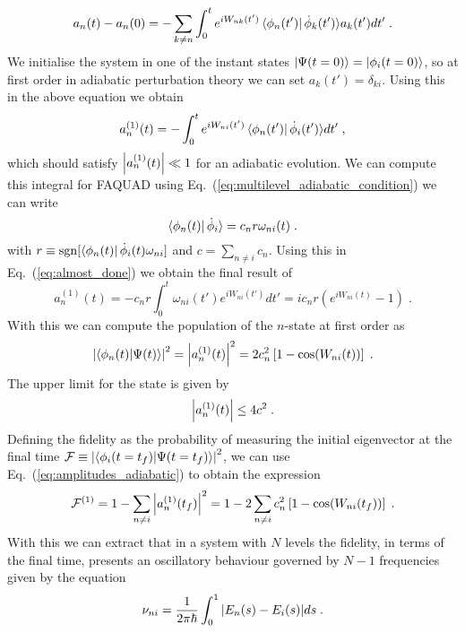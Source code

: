 \begin{equation}
	a_n(t)-a_n(0)=-\sum_{k\neq n}\int_0^te^{iW_{nk}(t')}\bra{\phi_n(t')}\dot{\phi}_k(t')\rangle a_k(t') dt'\; .
\end{equation}
We initialise the system in one of the instant states $\ket{\Psi(t=0)}=\ket{\phi_i(t=0)}$, so at first order in adiabatic perturbation theory we can set $a_k(t')=\delta_{ki}$. Using this in the above equation we obtain
\begin{equation}
	a_n^{(1)}(t)=-\int_0^te^{iW_{ni}(t')}\bra{\phi_n(t')}\dot{\phi}_i(t')\rangle dt'\; ,
	\label{eq:almost_done}
\end{equation}
which should satisfy $\abs{a_n^{(1)}(t)}\ll 1$ for an adiabatic evolution. We can compute this integral for FAQUAD using Eq.~(\ref{eq:multilevel_adiabatic_condition}) we can write
\begin{equation}
	\bra{\phi_n(t)}\dot{\phi}_i\rangle=c_nr\omega_{ni}(t)\; .
\end{equation}
with $r\equiv\operatorname{sgn}[\bra{\phi_n(t)}\dot{\phi}_i(t)\omega_{ni}]$ and $c=\sum_{n\neq i}c_n$. Using this in Eq.~(\ref{eq:almost_done}) we obtain the final result of
\begin{equation}
	a_n^{(1)}(t)=-c_nr\int_0^t\omega_{ni}(t')e^{iW_{ni}(t')}dt'=ic_nr\left(e^{iW_{ni}(t)}-1\right)\; .
\end{equation}
With this we can compute the population of the $n$-state at first order as
\begin{equation}
	\abs{\braket{\phi_n(t)}{\Psi(t)}}^2=\abs{a^{(1)}_n(t)}^2=2c_n^2\left[1-\cos(W_{ni}(t))\right]\; .
	\label{eq:amplitudes_adiabatic}
\end{equation}
The upper limit for the state is given by
\begin{equation}
	\abs{a_n^{(1)}(t)}\leq 4c^2\; .
\end{equation}
Defining the fidelity as the probability of measuring the initial eigenvector at the final time $\mathcal{F}\equiv \abs{\braket{\phi_i(t=t_f)}{\Psi(t=t_f)}}^2$, we can use Eq.~(\ref{eq:amplitudes_adiabatic}) to obtain the expression
\begin{equation}
	\mathcal{F}^{(1)}=1-\sum_{n\neq i}\abs{a_n^{(1)}(t_f)}^2=1-2\sum_{n\neq i}c_n^2\left[1-\cos(W_{ni}(t_f))\right]\; .
	\label{eq:FAQUAD_fidelity}
\end{equation}
With this we can extract that in a system with $N$ levels the fidelity, in terms of the final time, presents an oscillatory behaviour governed by $N-1$ frequencies given by the equation
\begin{equation}
	\nu_{ni}=\frac{1}{2\pi\hbar}\int_0^1\abs{E_n(s)-E_i(s)}ds\; .
	\label{eq:FAQUAD_frecuencies}
\end{equation}


